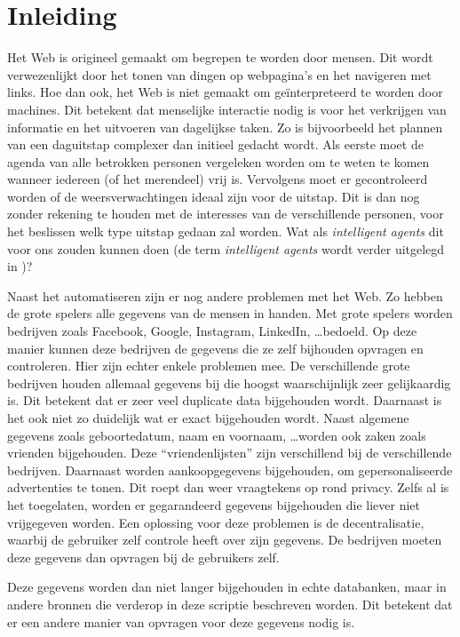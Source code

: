 \chapter{Inleiding}
Het Web is origineel gemaakt om begrepen te worden door mensen. Dit wordt verwezenlijkt door het tonen van dingen op webpagina's en het navigeren met links. Hoe dan ook, het Web is niet gemaakt om geïnterpreteerd te worden door machines. Dit betekent dat menselijke interactie nodig is voor het verkrijgen van informatie en het uitvoeren van dagelijkse taken. Zo is bijvoorbeeld het plannen van een daguitstap complexer dan initieel gedacht wordt. Als eerste moet de agenda van alle betrokken personen vergeleken worden om te weten te komen wanneer iedereen (of het merendeel) vrij is. Vervolgens moet er gecontroleerd worden of de weersverwachtingen ideaal zijn voor de uitstap. Dit is dan nog zonder rekening te houden met de interesses van de verschillende personen, voor het beslissen welk type uitstap gedaan zal worden. Wat als \textit{intelligent agents} dit voor ons zouden kunnen doen (de term \textit{intelligent agents} wordt verder uitgelegd in )?

Naast het automatiseren zijn er nog andere problemen met het Web. Zo hebben de grote spelers alle gegevens van de mensen in handen. Met grote spelers worden bedrijven zoals Facebook, Google, Instagram, LinkedIn, \dots bedoeld. Op deze manier kunnen deze bedrijven de gegevens die ze zelf bijhouden opvragen en controleren. Hier zijn echter enkele problemen mee. De verschillende grote bedrijven houden allemaal gegevens bij die hoogst waarschijnlijk zeer gelijkaardig is. Dit betekent dat er zeer veel duplicate data bijgehouden wordt. Daarnaast is het ook niet zo duidelijk wat er exact bijgehouden wordt. Naast algemene gegevens zoals geboortedatum, naam en voornaam, \dots worden ook zaken zoals vrienden bijgehouden. Deze ``vriendenlijsten'' zijn verschillend bij de verschillende bedrijven. Daarnaast worden aankoopgegevens bijgehouden, om gepersonaliseerde advertenties te tonen. Dit roept dan weer vraagtekens op rond privacy. Zelfs al is het toegelaten, worden er gegarandeerd gegevens bijgehouden die liever niet vrijgegeven worden. Een oplossing voor deze problemen is de decentralisatie, waarbij de gebruiker zelf controle heeft over zijn gegevens. De bedrijven moeten deze gegevens dan opvragen bij de gebruikers zelf. 

Deze gegevens worden dan niet langer bijgehouden in echte databanken, maar in andere bronnen die verderop in deze scriptie beschreven worden. Dit betekent dat er een andere manier van opvragen voor deze gegevens nodig is.

